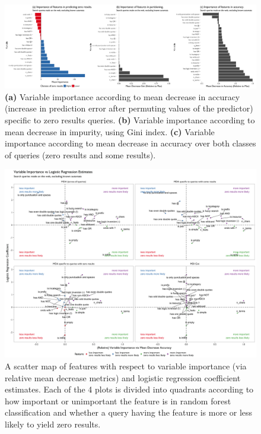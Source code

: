\documentclass[12pt,]{article}
\begin{document}
\begin{landscape}

\begin{figure}[h!]
\centering
\includegraphics{figures/var_imp_zrr.png}
\caption{\textbf{(a)} Variable importance according to mean decrease in accuracy (increase in prediction error after permuting values of the predictor) specific to zero results queries. \textbf{(b)} Variable importance according to mean decrease in impurity, using Gini index. \textbf{(c)} Variable importance according to mean decrease in accuracy over both classes of queries (zero results and some results).}
\label{fig:var_imp_zrr}
\end{figure}

\end{landscape}

\newpage

\begin{landscape}

\begin{figure}[h!]
\centering
\includegraphics{figures/mda_logitcoef_zrr.png}
\caption{A scatter map of features with respect to variable importance (via relative mean decrease metrics) and logistic regression coefficient estimates. Each of the 4 plots is divided into quadrants according to how important or unimportant the feature is in random forest classification and whether a query having the feature is more or less likely to yield zero results.}
\label{fig:mda_logitcoef_zrr}
\end{figure}

\end{landscape}
\end{document}
